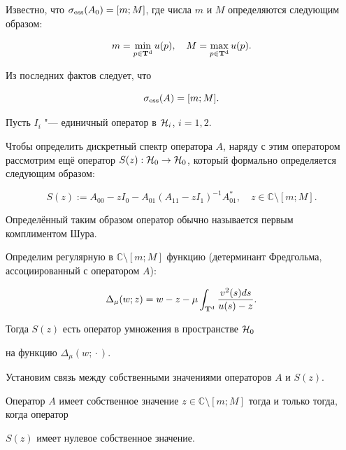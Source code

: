 Известно, что $\sigma_{\rm ess}(A_0)=[m; M]$, где числа $m$ и $M$ определяются следующим образом:

$$

m = \min\limits_{p\in {\bf T}^{\rm d}} u(p),\quad M =

\max\limits_{p\in {\bf T}^{\rm d}} u(p).

$$

Из последних фактов следует, что

\begin{equation}

\sigma_{\rm ess}(A)=[m; M]. \label{eq:RD:13}

\end{equation}



Пусть $I_i$ "--- единичный оператор в ${\cal H}_i$, $i=1, 2$. 

Чтобы определить дискретный спектр оператора $A$, наряду с этим оператором рассмотрим ещё оператор $S(z): {\cal H}_{0} \to {\cal H}_{0}$, который формально определяется следующим образом:

$$

S(z):=A_{00}-zI_0-A_{01}(A_{11}-zI_1)^{-1}A_{01}^*,\quad z \in

{\mathbb C} \setminus [m; M].

$$

Определённый таким образом оператор обычно называется первым комплиментом Шура.



Определим регулярную в ${\mathbb C}\setminus [m; M]$ функцию (детерминант Фредгольма, ассоциированный с оператором $A$):

$$

\Delta_{\mu}(w; z)=w-z- \mu\int_{{\bf T}^{\rm d}} \frac{

v^2(s)ds}{u(s)-z}.

$$

Тогда $S(z)$ есть оператор умножения в пространстве ${\cal H}_0$

на функцию $\Delta_{\mu}(w; {}\cdot{})$.



Установим связь между собственными значениями операторов $A$ и $S(z)$.



\smallskip



\hypertarget{RD:lemma1}{}



\begin{lemma}[1] Оператор $A$ имеет собственное значение $z \in

{\mathbb C} \setminus [m; M]$ тогда и только тогда$,$ когда оператор

$S(z)$ имеет нулевое собственное значение$.$

\end{lemma}



